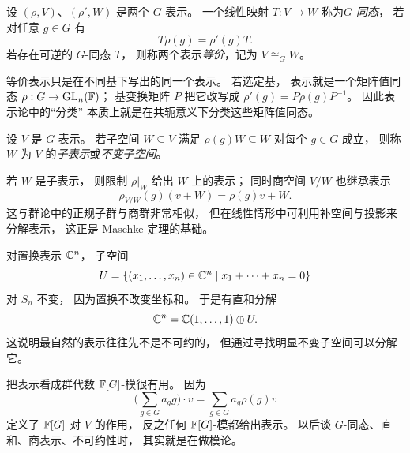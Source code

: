 \begin{definition}
设 $(\rho,V)$、$(\rho',W)$ 是两个 $G$-表示。 一个线性映射 $T:V\to W$ 称为\emph{$G$-同态}， 若对任意 $g\in G$ 有
\[
T\rho(g)=\rho'(g)T.
\]
若存在可逆的 $G$-同态 $T$， 则称两个表示\emph{等价}，记为 $V\cong_G W$。
\end{definition}
等价表示只是在不同基下写出的同一个表示。 若选定基， 表示就是一个矩阵值同态 $\rho:G\to \mathrm{GL}_n(\mathbb{F})$； 基变换矩阵 $P$ 把它改写成 $\rho'(g)=P\rho(g)P^{-1}$。 因此表示论中的“分类” 本质上就是在共轭意义下分类这些矩阵值同态。
\begin{definition}
设 $V$ 是 $G$-表示。 若子空间 $W\subseteq V$ 满足 $\rho(g)W\subseteq W$ 对每个 $g\in G$ 成立， 则称 $W$ 为 $V$ 的\emph{子表示}或\emph{不变子空间}。
\end{definition}
若 $W$ 是子表示， 则限制 $\rho|_W$ 给出 $W$ 上的表示； 同时商空间 $V/W$ 也继承表示
\[
\rho_{V/W}(g)(v+W)=\rho(g)v+W.
\]
这与群论中的正规子群与商群非常相似， 但在线性情形中可利用补空间与投影来分解表示， 这正是 Maschke 定理的基础。
\begin{example}
对置换表示 $\mathbb{C}^n$， 子空间
\[
U=\{(x_1,\dots,x_n)\in \mathbb{C}^n\mid x_1+\cdots+x_n=0\}
\]
对 $S_n$ 不变， 因为置换不改变坐标和。 于是有直和分解
\[
\mathbb{C}^n=\mathbb{C}(1,\dots,1)\oplus U.
\]
这说明最自然的表示往往先不是不可约的， 但通过寻找明显不变子空间可以分解它。
\end{example}
\begin{remark}
把表示看成群代数 $\mathbb{F}[G]$-模很有用。 因为
\[
\Big(\sum_{g\in G} a_g g\Big)\cdot v=\sum_{g\in G} a_g\rho(g)v
\]
定义了 $\mathbb{F}[G]$ 对 $V$ 的作用， 反之任何 $\mathbb{F}[G]$-模都给出表示。 以后谈 $G$-同态、直和、商表示、不可约性时， 其实就是在做模论。
\end{remark}
